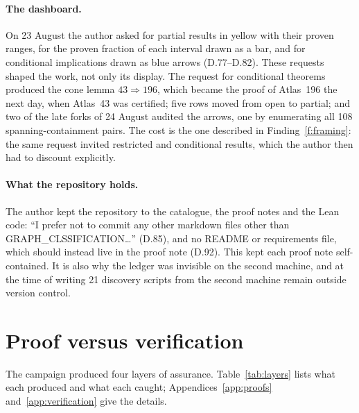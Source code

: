 \documentclass[11pt,a4paper]{article}
\begin{document}
\paragraph{The dashboard.} On 23 August the author asked for partial results in yellow with their proven ranges,
for the proven fraction of each interval drawn as a bar, and for conditional implications drawn as blue arrows
(D.77--D.82). These requests shaped the work, not only its display. The request for conditional theorems produced
the cone lemma $43\Rightarrow196$, which became the proof of Atlas~196 the next day, when Atlas~43 was
certified; five rows moved from open to partial; and two of the late forks of 24 August audited the arrows, one
by enumerating all 108 spanning-containment pairs. The cost is the one described in Finding~\ref{f:framing}: the
same request invited restricted and conditional results, which the author then had to discount explicitly.

\paragraph{What the repository holds.} The author kept the repository to the catalogue, the proof notes and the
Lean code: ``I prefer not to commit any other markdown files other than GRAPH\_CLSSIFICATION\dots'' (D.85), and
no README or requirements file, which should instead live in the proof note (D.92). This kept each proof note
self-contained. It is also why the ledger was invisible on the second machine, and at the time of writing 21
discovery scripts from the second machine remain outside version control.

\section{Proof versus verification}\label{sec:proofverif}

The campaign produced four layers of assurance. Table~\ref{tab:layers} lists what each produced and what
each caught; Appendices~\ref{app:proofs} and~\ref{app:verification} give the details.
\end{document}
